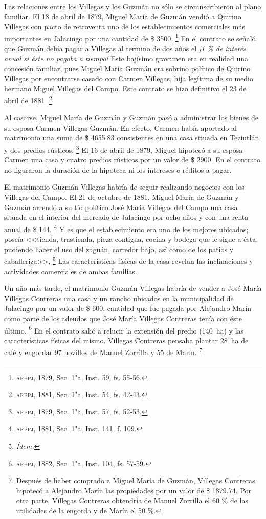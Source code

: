 \documentclass[14pt,twoside,final]{extbook} %
\let\oldfootnote\footnote
\renewcommand\footnote[1]{%
\oldfootnote{\hspace{1mm}#1}}
\begin{document}
Las relaciones entre los Villegas y los Guzmán no sólo se circunscribieron al plano familiar. El 18 de abril de 1879, Miguel María de Guzmán vendió a Quirino Villegas con pacto de retroventa uno de los establecimientos comerciales más importantes en Jalacingo por una cantidad de \$ 3500.\footnote{\textsc{arppj}, 1879, Sec. 1"a, Inst. 59, fs. 55-56.} En el contrato se señaló que Guzmán debía pagar a Villegas al termino de dos años el \emph{¡1 \% de interés anual si éste no pagaba a tiempo!} Este bajísimo gravamen era en realidad una concesión familiar, pues Miguel María Guzmán era sobrino político de Quirino Villegas por encontrarse casado con Carmen Villegas, hija legítima de su medio hermano Miguel Villegas del Campo. Este contrato se hizo definitivo el 23 de abril de 1881.\footnote{\textsc{arppj}, 1881, Sec. 1"a, Inst. 54, fs. 42-43.}

Al casarse, Miguel María de Guzmán y Guzmán pasó a administrar los bienes de su esposa Carmen Villegas Guzmán. En efecto, Carmen había aportado al matrimonio una suma de \$ 4655.83 consistentes en una casa situada en Teziutlán y dos predios rústicos.\footnote{\textsc{arppj}, 1879, Sec. 1"a, Inst. 57, fs. 52-53.} El 16 de abril de 1879, Miguel hipotecó a su esposa Carmen una casa y cuatro predios rústicos por un valor de \$ 2900. En el contrato no figuraron la duración de la hipoteca ni los intereses o réditos a pagar.

El matrimonio Guzmán Villegas habría de seguir realizando negocios con los Villegas del Campo. El 21 de octubre de 1881, Miguel María de Guzmán y Guzmán arrendó a su tío político José María Villegas del Campo una casa situada en el interior del mercado de Jalacingo por ocho años y con una renta anual de \$ 144.\footnote{\textsc{arppj}, 1881, Sec. 1"a, Inst. 141, f. 109.} Y es que el establecimiento era uno de los mejores ubicados; poseía <<tienda, trastienda, pieza contigua, cocina y bodega que le sigue a ésta, pudiendo hacer el uso del zaguán, corredor bajo, así como de los patios y caballeriza>>.\footnote{\em Ídem.} Las características físicas de la casa revelan las inclinaciones y actividades comerciales de ambas familias.

Un año más tarde, el matrimonio Guzmán Villegas habría de vender a José María Villegas Contreras una casa y un rancho ubicados en la municipalidad de Jalacingo por un valor de \$ 600, cantidad que fue pagada por Alejandro Marín como parte de los adeudos que José María Villegas Contreras tenía con éste último.\footnote{\textsc{arppj}, 1882, Sec. 1"a, Inst. 104, fs. 57-59.} En el contrato salió a relucir la extensión del predio (140~ha) y las características físicas del mismo. Villegas Contreras pensaba plantar 28~ha de café y engordar 97 novillos de Manuel Zorrilla y 55 de Marín.\footnote{Después de haber comprado a Miguel María de Guzmán, Villegas Contreras hipotecó a Alejandro Marín las propiedades por un valor de \$ 1879.74. Por otra parte, Villegas Contreras obtendría de Manuel Zorrilla el 60 \% de las utilidades de la engorda y de Marín el 50 \%.}
\end{document}
